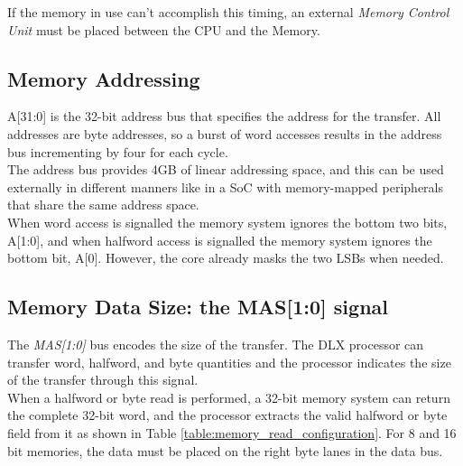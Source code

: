 If the memory in use can't accomplish this timing, an external \emph{Memory Control Unit} must be placed between the CPU and the Memory.

\subsection{Memory Addressing}
A[31:0] is the 32-bit address bus that specifies the address for the transfer. All addresses are byte addresses, so a burst of word accesses results in the address bus incrementing by four for each cycle.\\

The address bus provides 4GB of linear addressing space, and this can be used externally in different manners like in a SoC with memory-mapped peripherals that share the same address space.\\

When word access is signalled the memory system ignores the bottom two bits, A[1:0], and when halfword access is signalled the memory system ignores the bottom bit, A[0]. However, the core already masks the two LSBs when needed.

\subsection{Memory Data Size: the MAS[1:0] signal}
\label{mas}

The \emph{MAS[1:0]} bus encodes the size of the transfer. The DLX processor can transfer word, halfword, and byte quantities and the processor indicates the size of the transfer through this signal.\\

When a halfword or byte read is performed, a 32-bit memory system can return the complete 32-bit word, and the processor extracts the valid halfword or byte field from it as shown in Table \ref{table:memory_read_configuration}. For 8 and 16 bit memories, the data must be placed on the right byte lanes in the data bus.


